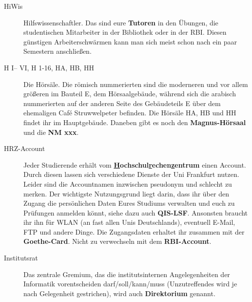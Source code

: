 \begin{description}
\item[HiWis] Hilfswissenschaftler. Das sind eure \textbf{Tutoren} in
den Übungen, die studentischen Mitarbeiter in der Bibliothek oder in
der RBI. Diesen günstigen Arbeiterschwärmen kann man sich meist
schon nach ein paar Semestern anschließen.




\item[H I– VI, H 1-16, HA, HB, HH] Die Hörsäle. Die römisch
nummerierten sind die moderneren und vor allem größeren im Bauteil E,
dem Hörsaalgebäude, während sich die arabisch nummerierten auf der
anderen Seite des Gebäudeteils E über dem ehemaligen Café
Struwwelpeter befinden. Die Hörsäle HA, HB und HH findet ihr im
Hauptgebäude. Daneben gibt es noch den \textbf{Magnus-Hörsaal} und die
\textbf{NM xxx}.


\item[HRZ-Account] Jeder Studierende erhält vom
\textbf{\underline{H}ochschul\underline{r}echen\underline{z}entrum}
einen Account. Durch diesen lassen sich verschiedene
Dienste der Uni Frankfurt nutzen. Leider sind die Accountnamen
inzwischen pseudonym und schlecht zu merken. Der wichtigste
Nutzungsgrund liegt darin, dass ihr über den Zugang die
persönlichen Daten Eures Studiums verwalten und euch zu Prüfungen
anmelden könnt, siehe dazu auch \textbf{QIS-LSF}. Ansonsten braucht
ihr ihn für WLAN (an fast allen Unis Deutschlands), eventuell E-Mail,
FTP und andere Dinge. Die Zugangsdaten erhaltet ihr zusammen mit der
\textbf{Goethe-Card}. Nicht zu verwechseln mit dem
\textbf{RBI-Account}.

\item[Institutsrat] Das zentrale Gremium, das die institutsinternen
Angelegenheiten der Informatik vorentscheiden darf/soll/kann/muss
(Unzutreffendes wird je nach Gelegenheit gestrichen), wird auch
\textbf{Direktorium} genannt.




\end{description}
